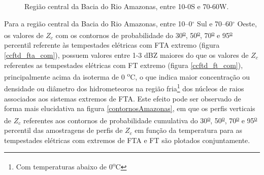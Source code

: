 \begin{figure}[!ht]
  \centering
  \caption{Região central da Bacia do Rio Amazonas, entre 10-0S e 70-60W.}
  \label{deriv_amazonas}  
\end{figure} 

Para a região central da Bacia do Rio Amazonas, entre 10--0$^{\circ}$ Sul e 70--60$^{\circ}$ Oeste, os valores de $Z_c$ com os contornos de probabilidade do 30\textsuperscript{\underline{o}}, 50\textsuperscript{\underline{o}}, 70\textsuperscript{\underline{o}} e 95\textsuperscript{\underline{o}} percentil referente às tempestades elétricas com FTA extremo (figura \ref{ccftd_fta_com}), possuem valores entre 1-3 dBZ maiores do que os valores de $Z_c$ referentes as tempestades elétricas com FT extremo (figura \ref{ccftd_ft_com}), principalmente acima da isoterma de 0 \textsuperscript{o}C, o que indica maior concentração ou densidade ou diâmetro dos hidrometeoros na região fria\footnote{Com temperaturas abaixo de  0\textsuperscript{o}C} dos núcleos de raios associados aos sistemas extremos de FTA. Este efeito pode ser observado de forma mais elucidativa na figura \ref{contornosAmazonas}, em que os perfis verticais de $Z_c$ referentes aos contornos de probabilidade cumulativa do 30\textsuperscript{\underline{o}}, 50\textsuperscript{\underline{o}}, 70\textsuperscript{\underline{o}} e 95\textsuperscript{\underline{o}} percentil das amostragens de perfis de $Z_c$ em função da temperatura  para as tempestades elétricas com extremos de FTA e FT são plotados conjuntamente.

